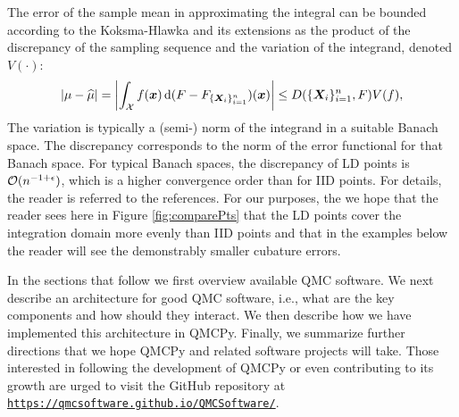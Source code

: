 \documentclass[graybox,footinfo]{svmult}
\newcommand{\hmu}{\widehat{\mu}}
\newcommand{\abs}[1]{\left \lvert #1 \right \rvert}
\begin{document}
The error of the sample mean in approximating the integral can be bounded according to the Koksma-Hlawka and its extensions as the product of the discrepancy of the sampling sequence and the variation of the integrand, denoted $V(\cdot)$:
\begin{equation}
	\abs{\mu - \hmu} = \abs{\int_{\calX} f(\bsx) \, \D (F - F_{\{\bsX_i\}_{i=1}^n}) (\bsx)} \le D(\{\bsX_i\}_{i=1}^n, F) V(f),
\end{equation} 
The variation is typically a (semi-) norm of the integrand in a suitable Banach space.  The discrepancy corresponds to the norm of the error functional for that Banach space.  For typical Banach spaces, the discrepancy of LD points is ${\mathcal{O}}(n^{-1+\epsilon})$, which is a higher convergence order than for IID points.  For details, the reader is referred to the references.  For our purposes, the we hope  that the reader sees here in Figure \ref{fig:comparePts} that the LD points cover the integration domain more evenly than IID points and that in the examples below the reader will see the demonstrably smaller cubature errors.

In the sections that follow we first overview available QMC software.  We next describe an architecture for good QMC software, i.e., what are the key components and how should they interact.  We then describe how we have implemented this architecture in QMCPy.  Finally, we summarize further directions that we hope QMCPy and related software projects will take.  Those interested in following the development of QMCPy or even contributing to its growth are urged to visit the GitHub repository at \href{https://qmcsoftware.github.io/QMCSoftware/}{\nolinkurl{https://qmcsoftware.github.io/QMCSoftware/}}.
\end{document}

